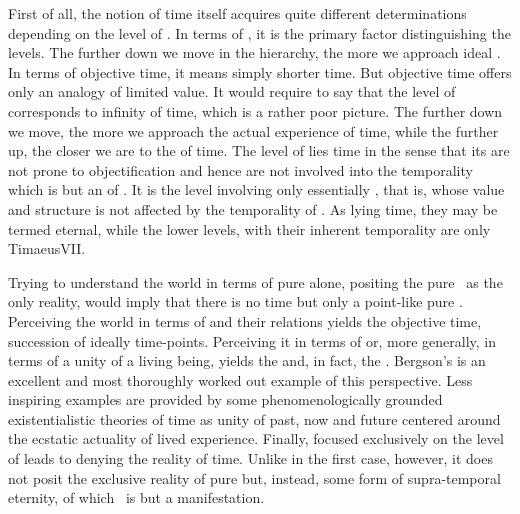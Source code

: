 \pa
First of all, the notion of time itself
acquires quite different determinations depending on the level of
.
In terms of , it is the primary factor distinguishing the levels.
The further down we move in the hierarchy, the more we approach
ideal .  In terms of objective time, it means simply
shorter time.  But objective time offers only an analogy of limited value.  It
would require to say that the level of  corresponds to infinity
of time, which is a rather poor picture. The further down we move, the more we
approach the actual experience of  time, while the further up, the
closer we are to the  of time.  The level of  lies
 time in the sense that its  are not prone to
{objectification} and hence are not involved into the temporality which is
but an  of .  It is the level involving only essentially
 , that is,  whose value and
structure is not affected by the temporality of . As lying
 time, they may be termed eternal, while the lower levels, with their
inherent temporality are only \citet{moving image of eternity.}{Timaeus}{VII}. 

Trying to understand the world in terms of pure  alone, positing
the pure \herenow\ as the only reality, would imply that there is no time but
only a point-like pure .
Perceiving the world in  terms of  and their
relations yields the objective time, succession of ideally  time-points.
Perceiving it in 
terms of  or, more generally, in terms of a unity of a living being,
yields the  and, in fact, the . Bergson's
 is an excellent and most thoroughly worked out example of this
perspective. Less inspiring examples are provided by some phenomenologically
grounded existentialistic theories of time as unity of past, now and future
centered around the ecstatic actuality of lived experience.
Finally,  focused exclusively on the level of  leads to
denying the reality of time. Unlike in the first case, however, it does not posit
the exclusive reality of pure  but, instead, some form of
supra-temporal eternity, of which \herenow\ is but a manifestation. 

